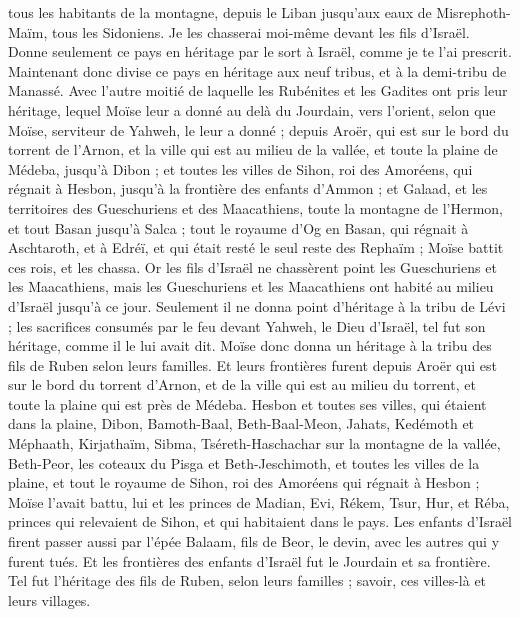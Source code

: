\begin{multicols}{2}
tous les habitants de la montagne, depuis le Liban jusqu'aux eaux de Misrephoth-Maïm, tous les Sidoniens. Je les chasserai moi-même devant les fils d'Israël. Donne seulement ce pays en héritage par le sort à Israël, comme je te l'ai prescrit.
Maintenant donc divise ce pays en héritage aux neuf tribus, et à la demi-tribu de Manassé.
Avec l'autre moitié de laquelle les Rubénites et les Gadites ont pris leur héritage, lequel Moïse leur a donné au delà du Jourdain, vers l'orient, selon que Moïse, serviteur de Yahweh, le leur a donné ;
depuis Aroër, qui est sur le bord du torrent de l'Arnon, et la ville qui est au milieu de la vallée, et toute la plaine de Médeba, jusqu'à Dibon ;
et toutes les villes de Sihon, roi des Amoréens, qui régnait à Hesbon, jusqu'à la frontière des enfants d'Ammon ;
et Galaad, et les territoires des Gueschuriens et des Maacathiens, toute la montagne de l'Hermon, et tout Basan jusqu'à Salca ;
tout le royaume d'Og en Basan, qui régnait à Aschtaroth, et à Edréï, et qui était resté le seul reste des Rephaïm ; Moïse battit ces rois, et les chassa.
Or les fils d'Israël ne chassèrent point les Gueschuriens et les Maacathiens, mais les Gueschuriens et les Maacathiens ont habité au milieu d'Israël jusqu'à ce jour.
Seulement il ne donna point d'héritage à la tribu de Lévi ; les sacrifices consumés par le feu devant Yahweh, le Dieu d'Israël, tel fut son héritage, comme il le lui avait dit.
Moïse donc donna un héritage à la tribu des fils de Ruben selon leurs familles.
Et leurs frontières furent depuis Aroër qui est sur le bord du torrent d'Arnon, et de la ville qui est au milieu du torrent, et toute la plaine qui est près de Médeba.
Hesbon et toutes ses villes, qui étaient dans la plaine, Dibon, Bamoth-Baal, Beth-Baal-Meon,
Jahats, Kedémoth et Méphaath,
Kirjathaïm, Sibma, Tséreth-Haschachar sur la montagne de la vallée,
Beth-Peor, les coteaux du Pisga et Beth-Jeschimoth,
et toutes les villes de la plaine, et tout le royaume de Sihon, roi des Amoréens qui régnait à Hesbon ; Moïse l'avait battu, lui et les princes de Madian, Evi, Rékem, Tsur, Hur, et Réba, princes qui relevaient de Sihon, et qui habitaient dans le pays.
Les enfants d'Israël firent passer aussi par l’épée Balaam, fils de Beor, le devin, avec les autres qui y furent tués.
Et les frontières des enfants d'Israël fut le Jourdain et sa frontière. Tel fut l'héritage des fils de Ruben, selon leurs familles ; savoir, ces villes-là et leurs villages.

\end{multicols}
